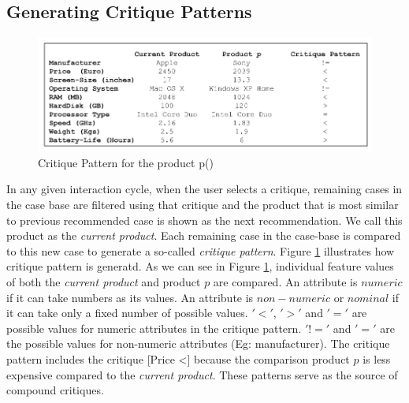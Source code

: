 \subsection{Generating Critique Patterns}
\label{sec:genCritique}
\begin{figure}
  \centering
    \includegraphics[width=1.0\textwidth]{figures-bharath/critiquePatterns.png}
  \caption{Critique Pattern for the product p(\cite{reilly04})}
\label{fig:critiquePatterns}
\end{figure}
In any given interaction cycle, when the user selects a critique, remaining cases in the case base are filtered using that critique and the product that is most similar to previous recommended case is shown as the next recommendation.
We call this product as the \textit{current product}.
Each remaining case in the case-base is compared to this new case to generate a so-called \textit{critique pattern}. Figure \ref{fig:critiquePatterns} illustrates how critique pattern is generatd.
As we can see in Figure \ref{fig:critiquePatterns}, individual feature values of both the \textit{current product} and product $p$ are compared.
An attribute is $numeric$ if it can take numbers as its values.
An attribute is $non-numeric$ or $nominal$ if it can take only a fixed number of possible values.
\textbf{$'<'$}, \textbf{$'>'$} and \textbf{$'='$} are possible values for numeric attributes in the critique pattern.
$'!='$ and $'='$ are the possible values for non-numeric attributes (Eg: manufacturer).
The critique pattern includes the critique [Price \textless] because the comparison product $p$ is less expensive compared to the \textit{current product}.
These patterns serve as the source of compound critiques.


